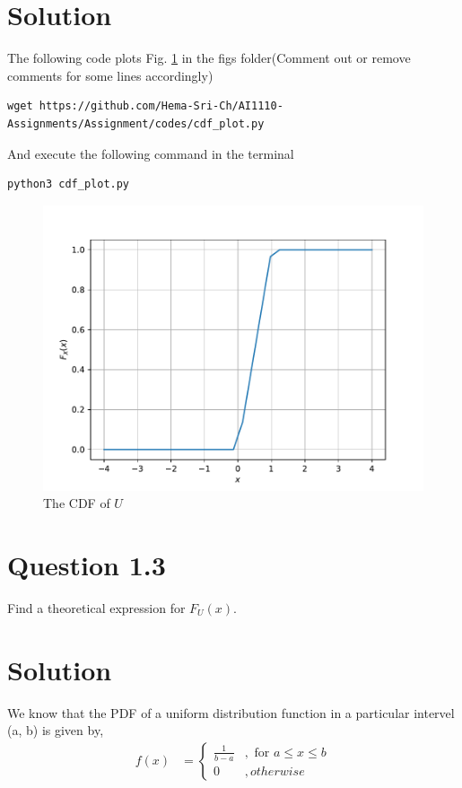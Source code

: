 \documentclass[16pt, a4paper, two column]{article}
\begin{document}
\section*{Solution}
The following code plots Fig. \ref{fig:uni_cdf} in the figs folder(Comment out or remove comments for some lines accordingly)
\begin{lstlisting}
wget https://github.com/Hema-Sri-Ch/AI1110-Assignments/Assignment/codes/cdf_plot.py
\end{lstlisting}
And execute the following command in the terminal 
\begin{lstlisting}
python3 cdf_plot.py
\end{lstlisting}
\begin{figure}[h]
	\centering
	\includegraphics[width=\columnwidth]{uni_cdf}
	\caption{The CDF of $U$}
	\label{fig:uni_cdf}
\end{figure}
\section*{Question 1.3} Find a theoretical expression for $F_U(x)$.

\section*{Solution}
We know that the PDF of a uniform distribution function in a particular intervel (a, b) is given by,
\begin{align}
	f(x) &= \begin{cases} \frac{1}{b-a} &,\text{ for } a \leq x \leq b \\
	0 &, otherwise\end{cases}
\end{align}
\end{document}
